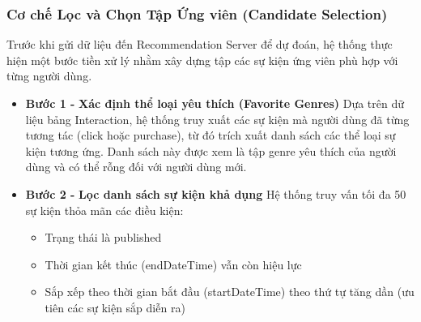 \subsubsection{Cơ chế Lọc và Chọn Tập Ứng viên (Candidate Selection)}
\indent \indent Trước khi gửi dữ liệu đến Recommendation Server để dự đoán, hệ thống thực hiện một bước tiền xử lý nhằm xây dựng tập các sự kiện ứng viên phù hợp với từng người dùng.
\begin{itemize}
    \item[] \textbf{Bước 1 -} \textbf{Xác định thể loại yêu thích (Favorite Genres)}
    Dựa trên dữ liệu bảng Interaction, hệ thống truy xuất các sự kiện mà người dùng đã từng tương tác (click hoặc purchase), từ đó trích xuất danh sách các thể loại sự kiện tương ứng. Danh sách này được xem là tập genre yêu thích của người dùng và có thể rỗng đối với người dùng mới.

    \item[] \textbf{Bước 2 -} \textbf{Lọc danh sách sự kiện khả dụng}
    Hệ thống truy vấn tối đa 50 sự kiện thỏa mãn các điều kiện:
    \begin{itemize}
        \item[-] Trạng thái là published
        \item[-] Thời gian kết thúc (endDateTime) vẫn còn hiệu lực
        \item[-] Sắp xếp theo thời gian bắt đầu (startDateTime) theo thứ tự tăng dần (ưu tiên các sự kiện sắp diễn ra)
    \end{itemize}
    

\end{itemize}
